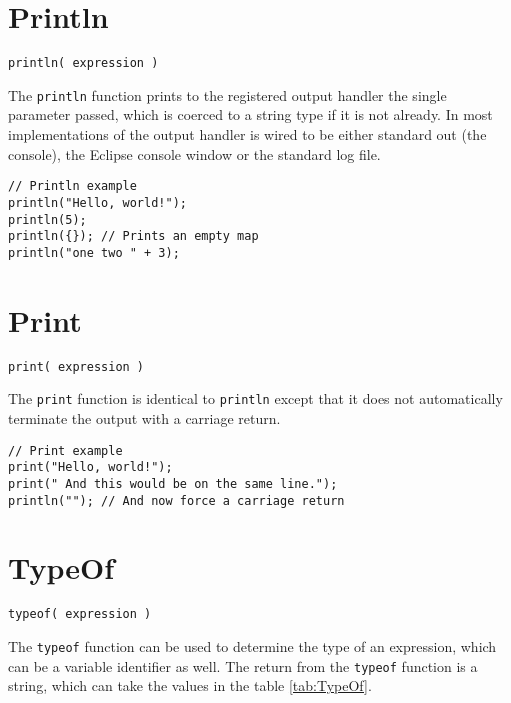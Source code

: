 \section{Println}
\begin{Verbatim}
println( expression )
\end{Verbatim}

The \Verb+println+ function prints to the registered output handler the single parameter passed, which is coerced to a string type if it is not already. In most implementations of \Reflex the output handler is wired to be either standard out (the console), the Eclipse console window or the standard log file.
\begin{lstlisting}[caption={println}]
// Println example
println("Hello, world!");
println(5);
println({}); // Prints an empty map
println("one two " + 3);
\end{lstlisting}

\section{Print}
\begin{Verbatim}
print( expression )
\end{Verbatim}

The \Verb+print+ function is identical to \verb+println+ except that it does not automatically terminate the output with a carriage return.
\begin{lstlisting}[caption={print}]
// Print example
print("Hello, world!");
print(" And this would be on the same line.");
println(""); // And now force a carriage return
\end{lstlisting}

\section{TypeOf}

\begin{Verbatim}
typeof( expression )
\end{Verbatim}

The \Verb+typeof+ function can be used to determine the type of an expression, which can be a variable identifier as well. The return from the \verb+typeof+ function is a string, which can take the values in the table \vref{tab:TypeOf}.


